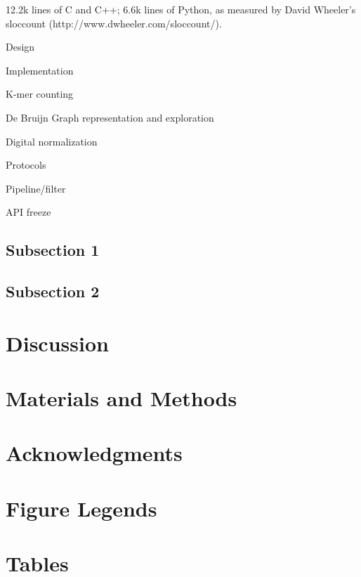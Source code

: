 \documentclass[10pt]{article}
\begin{document}
12.2k lines of C and C++; 6.6k lines of Python, as measured by David Wheeler's
 sloccount (http://www.dwheeler.com/sloccount/).

Design

Implementation

K-mer counting

De Bruijn Graph representation and exploration

Digital normalization

Protocols

Pipeline/filter

API freeze

\subsection*{Subsection 1}

\subsection*{Subsection 2}

\section*{Discussion}

\section*{Materials and Methods}

\section*{Acknowledgments}




\section*{Figure Legends}


\section*{Tables}
\end{document}
